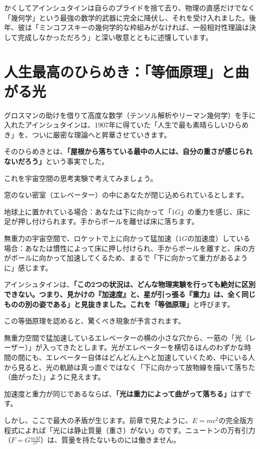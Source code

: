 かくしてアインシュタインは自らのプライドを捨て去り、物理の直感だけでなく「幾何学」という最強の数学的武器に完全に降伏し、それを受け入れました。後年、彼は「ミンコフスキーの幾何学的な枠組みがなければ、一般相対性理論は決して完成しなかっただろう」と深い敬意とともに述懐しています。

\section{人生最高のひらめき：「等価原理」と曲がる光}

グロスマンの助けを借りて高度な数学（テンソル解析やリーマン幾何学）を手に入れたアインシュタインは、1907年に得ていた「人生で最も素晴らしいひらめき」を、ついに厳密な理論へと昇華させていきます。

そのひらめきとは、\textbf{「屋根から落ちている最中の人には、自分の重さが感じられないだろう」}という事実でした。

これを宇宙空間の思考実験で考えてみましょう。

窓のない密室（エレベーター）の中にあなたが閉じ込められているとします。

地球上に置かれている場合：あなたは下に向かって「\(1G\)」の重力を感じ、床に足が押し付けられます。手からボールを離せば床に落ちます。

無重力の宇宙空間で、ロケットで上に向かって猛加速（\(1G\)の加速度）している場合：あなたは慣性によって床に押し付けられ、手からボールを離すと、床の方がボールに向かって加速してくるため、まるで「下に向かって重力があるように」感じます。

アインシュタインは、\textbf{「この2つの状況は、どんな物理実験を行っても絶対に区別できない。つまり、見かけの『加速度』と、星が引っ張る『重力』は、全く同じものの別の姿である」と見抜きました。これを「等価原理」}と呼びます。

この等価原理を認めると、驚くべき現象が予言されます。

無重力空間で猛加速しているエレベーターの横の小さな穴から、一筋の「光（レーザー）」が入ってきたとします。光がエレベーターを横切るほんのわずかな時間の間にも、エレベーター自体はどんどん上へと加速していくため、中にいる人から見ると、光の軌跡は真っ直ぐではなく「下に向かって放物線を描いて落ちた（曲がった）」ように見えます。

加速度と重力が同じであるならば、\textbf{「光は重力によって曲がって落ちる」}はずです。

しかし、ここで最大の矛盾が生じます。前章で見たように、\(E=mc^2\)の完全版方程式によれば「光には静止質量（重さ）がない」のです。ニュートンの万有引力（\(F=G\frac{mM}{r^2}\)）は、質量を持たないものには働きません。


